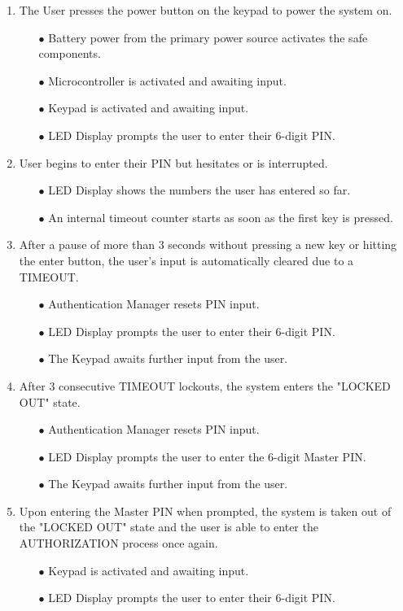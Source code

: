 \documentclass{article}
\begin{document}
\begin{enumerate}
    \item The User presses the power button on the keypad to power the system on.
    \begin{enumerate}
        \item[$\bullet$] Battery power from the primary power source activates the safe components.
        \item[$\bullet$] Microcontroller is activated and awaiting input.
        \item[$\bullet$] Keypad is activated and awaiting input.
        \item[$\bullet$] LED Display prompts the user to enter their 6-digit PIN.
    \end{enumerate}
    \item User begins to enter their PIN but hesitates or is interrupted.
    \begin{enumerate}
        \item[$\bullet$] LED Display shows the numbers the user has entered so far.
        \item[$\bullet$] An internal timeout counter starts as soon as the first key is pressed.
    \end{enumerate}
    \item After a pause of more than 3 seconds without pressing a new key or hitting the enter button, the user's input is automatically cleared due to a TIMEOUT.
    \begin{enumerate}
        \item[$\bullet$] Authentication Manager resets PIN input.
        \item[$\bullet$] LED Display prompts the user to enter their 6-digit PIN.
        \item[$\bullet$] The Keypad awaits further input from the user.
    \end{enumerate}
    \item After 3 consecutive TIMEOUT lockouts, the system enters the "LOCKED OUT" state.
    \begin{enumerate}
        \item[$\bullet$] Authentication Manager resets PIN input.
        \item[$\bullet$] LED Display prompts the user to enter the 6-digit Master PIN.
        \item[$\bullet$] The Keypad awaits further input from the user.
    \end{enumerate}
    \item Upon entering the Master PIN when prompted, the system is taken out of the "LOCKED OUT" state and the user is able to enter the AUTHORIZATION process once again.
    \begin{enumerate}
        \item[$\bullet$] Keypad is activated and awaiting input.
        \item[$\bullet$] LED Display prompts the user to enter their 6-digit PIN.
    \end{enumerate}
    
\end{enumerate}
\end{document}
